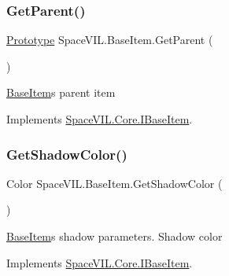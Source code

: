 \mbox{\label{class_space_v_i_l_1_1_base_item_af249ff93f366ebc0020d171276576426}} 
\subsubsection{\texorpdfstring{Get\+Parent()}{GetParent()}}
{\footnotesize\ttfamily \mbox{\hyperlink{class_space_v_i_l_1_1_prototype}{Prototype}} Space\+V\+I\+L.\+Base\+Item.\+Get\+Parent (\begin{DoxyParamCaption}{ }\end{DoxyParamCaption})\hspace{0.3cm}{\ttfamily [inline]}}



\mbox{\hyperlink{class_space_v_i_l_1_1_base_item}{Base\+Item}}\textquotesingle{}s parent item 



Implements \mbox{\hyperlink{interface_space_v_i_l_1_1_core_1_1_i_base_item}{Space\+V\+I\+L.\+Core.\+I\+Base\+Item}}.

\mbox{\label{class_space_v_i_l_1_1_base_item_a9130d928ceb471b497f3a73e0c5574b1}} 
\subsubsection{\texorpdfstring{Get\+Shadow\+Color()}{GetShadowColor()}}
{\footnotesize\ttfamily Color Space\+V\+I\+L.\+Base\+Item.\+Get\+Shadow\+Color (\begin{DoxyParamCaption}{ }\end{DoxyParamCaption})\hspace{0.3cm}{\ttfamily [inline]}}



\mbox{\hyperlink{class_space_v_i_l_1_1_base_item}{Base\+Item}}\textquotesingle{}s shadow parameters. Shadow color 



Implements \mbox{\hyperlink{interface_space_v_i_l_1_1_core_1_1_i_base_item}{Space\+V\+I\+L.\+Core.\+I\+Base\+Item}}.

